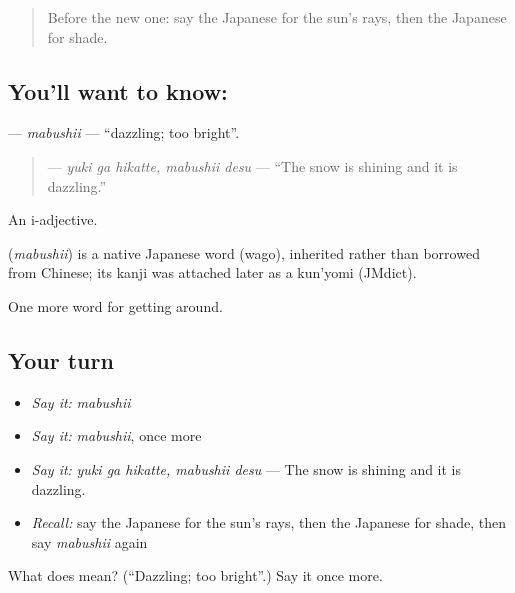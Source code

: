 \label{lesson:JA-C414-mabushii}



\begin{quote}
Before the new one: say the Japanese for the sun's rays, then the Japanese for shade.
\end{quote}

\subsection*{You'll want to know: }
\textbf{} — \emph{mabushii} — \textquotedblleft{}dazzling; too bright\textquotedblright{}.

\begin{quote}
\textbf{ } — \emph{yuki ga hikatte, mabushii desu} — \textquotedblleft{}The snow is shining and it is dazzling.\textquotedblright{}
\end{quote}

An i-adjective.

\begin{cousinweb}
\textbf{} (\emph{mabushii}) is a native Japanese word (wago), inherited rather than borrowed from Chinese; its kanji was attached later as a kun'yomi (JMdict).
\end{cousinweb}

\begin{grammarlens}[title={What you've built}]
One more word for getting around.
\end{grammarlens}

\subsection*{Your turn}
\begin{itemize}
\raggedright
  \item \emph{Say it:} \emph{mabushii}
  \item \emph{Say it:} \emph{mabushii}, once more
  \item \emph{Say it:} \emph{yuki ga hikatte, mabushii desu} — The snow is shining and it is dazzling.
  \item \emph{Recall:} say the Japanese for the sun's rays, then the Japanese for shade, then say \emph{mabushii} again
\end{itemize}

\begin{tcolorbox}[breakable,colback=teal!4,colframe=teal!35!black,title={Before you move on}]
What does  mean? (\textquotedblleft{}Dazzling; too bright\textquotedblright{}.) Say it once more.
\end{tcolorbox}
